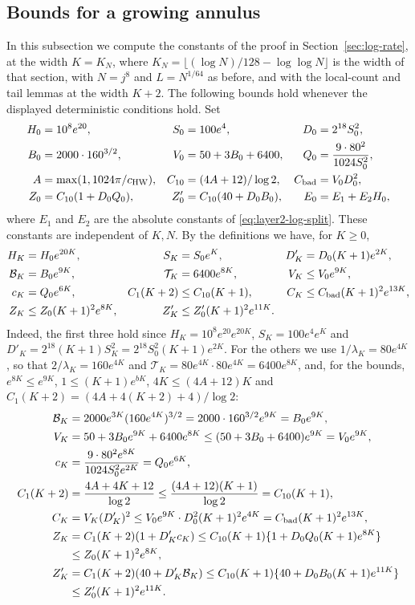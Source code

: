 \subsection{Bounds for a growing annulus}\label{app:growing-annulus}
In this subsection we compute the constants of the proof in
Section~\ref{sec:log-rate}, at the width $K=K_N$, where
$K_N=\lfloor(\log N)/128-\log\log N\rfloor$ is the width of that
section, with $N=j^8$ and $L=N^{1/64}$ as before, and with the
local-count and tail lemmas at the width $K+2$.
The following bounds hold whenever the displayed deterministic conditions
hold.
Set
\begin{align*}
 H_0&=10^8e^{20},&S_0&=100e^4,&D_0&=2^{18}S_0^2,\\
 B_0&=2000\cdot160^{3/2},&V_0&=50+3B_0+6400,&
 Q_0&=\frac{9\cdot80^2}{1024S_0^2},\\
 A&=\max(1,1024\pi/c_{\rm HW}),&C_{10}&=(4A+12)/\log2,&
 C_{\rm bad}&=V_0D_0^2,\\
 Z_0&=C_{10}(1+D_0Q_0),&Z'_0&=C_{10}(40+D_0B_0),&
 E_0&=E_1+E_2H_0,
\end{align*}
where $E_1$ and $E_2$ are the absolute constants of
\eqref{eq:layer2-log-split}.
These constants are independent of $K,N$.
By the definitions we have, for $K\ge0$,
\begin{align*}
 H_K&=H_0e^{20K},&S_K&=S_0e^K,&D'_K&=D_0(K+1)e^{2K},\\
 \mathcal B_K&=B_0e^{9K},&\mathcal T_K&=6400e^{8K},&V_K&\le V_0e^{9K},\\
 c_K&=Q_0e^{6K},&C_1(K+2)&\le C_{10}(K+1),&
 C_K&\le C_{\rm bad}(K+1)^2e^{13K},\\
 Z_K&\le Z_0(K+1)^2e^{8K},&Z'_K&\le Z'_0(K+1)^2e^{11K}.
\end{align*}
Indeed, the first three hold since $H_K=10^8e^{20}e^{20K}$,
$S_K=100e^4e^K$ and $D'_K=2^{18}(K+1)S_K^2=2^{18}S_0^2(K+1)e^{2K}$. For the
others we use $1/\lambda_K=80e^{4K}$, so that $2/\lambda_K=160e^{4K}$ and
$\mathcal T_K=80e^{4K}\cdot80e^{4K}=6400e^{8K}$, and, for the bounds,
$e^{8K}\le e^{9K}$, $1\le(K+1)e^{bK}$, $4K\le(4A+12)K$ and
$C_1(K+2)=(4A+4(K+2)+4)/\log2$:
\begin{align*}
 \mathcal B_K&=2000e^{3K}(160e^{4K})^{3/2}=2000\cdot160^{3/2}e^{9K}
 =B_0e^{9K},\\
 V_K&=50+3B_0e^{9K}+6400e^{8K}\le(50+3B_0+6400)e^{9K}=V_0e^{9K},\\
 c_K&=\frac{9\cdot80^2e^{8K}}{1024S_0^2e^{2K}}=Q_0e^{6K},\\
 C_1(K+2)&=\frac{4A+4K+12}{\log2}
 \le\frac{(4A+12)(K+1)}{\log2}=C_{10}(K+1),\\
 C_K&=V_K(D'_K)^2
 \le V_0e^{9K}\cdot D_0^2(K+1)^2e^{4K}
 =C_{\rm bad}(K+1)^2e^{13K},\\
 Z_K&=C_1(K+2)(1+D'_Kc_K)
 \le C_{10}(K+1)\{1+D_0Q_0(K+1)e^{8K}\}\\
 &\le Z_0(K+1)^2e^{8K},\\
 Z'_K&=C_1(K+2)(40+D'_K\mathcal B_K)
 \le C_{10}(K+1)\{40+D_0B_0(K+1)e^{11K}\}\\
 &\le Z'_0(K+1)^2e^{11K}.
\end{align*}

